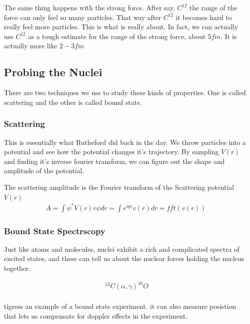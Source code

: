 \documentclass[english, 11pt]{article}
\begin{document}
        The same thing happens with the strong force. After say, $C^{12}$ the range of the force can only feel so many particles. That way after $C^{12}$ it becomes hard to really feel more particles. This is what  is really about. In fact, we can actually use $C^{12}$ as a tough estimate for the range of the strong force, about $5fm$. It is actually more like $2-3 fm$
  
      \subsection{Probing the Nuclei}
        There are two techniques we use to study these kinds of properties. One is called scattering and the other is called bound state.

      \subsubsection*{Scattering}
        This is essentially what Rutheford did back in the day. We throw particles into a potential and see how the potential changes it's trajectory. By sampling $V(r)$ and finding it's inverse fourier transform, we can figure out the shape and amplitude of the potential.

      \begin{defn}
      The scattering amplitude is the Fourier transform of the Scattering potential $V(r)$
        \begin{align*}
          A = \int \psi^{*}V(r)r\psi dr = \int e^{iqr}v(r)dr = fft(v(r))\
        \end{align*}
      \end{defn}

      \subsubsection{Bound State Spectrscopy}
      Just like atoms and molecules, nuclei exhibit a rich and complicated spectra of excited states, and these can tell us about the nuclear forces holding the nucleus together.

      \begin{align*}
        ^12C(\alpha,\gamma)^16O\\
      \end{align*}

      tigress an example of a bound state experiment. it can also measure posistion that lets us compensate for doppler effects in the experiment. 
\end{document}
